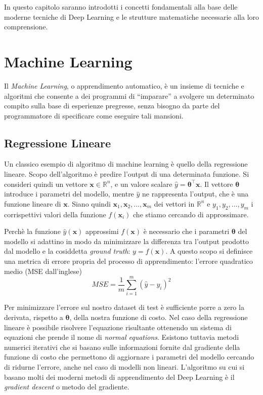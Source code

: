 
In questo capitolo saranno introdotti i concetti fondamentali alla base delle
moderne tecniche di Deep Learning e le strutture matematiche necessarie alla
loro comprensione.

\section{Machine Learning}
Il \emph{Machine Learning}, o apprendimento automatico, è un insieme di
tecniche e algoritmi che consente a dei programmi di ``imparare'' a svolgere
un determinato compito sulla base di esperienze pregresse, senza bisogno da
parte del programmatore di specificare come eseguire tali mansioni. 
\subsection{Regressione Lineare}
Un classico esempio di algoritmo di machine learning è quello della regressione
lineare. Scopo dell'algoritmo è predire l'output di una determinata funzione.
Si consideri quindi un vettore $ \bm x \in \mathbb{R}^n $, e un valore scalare
$\hat{y} = \bm \theta^\intercal \bm x$. Il vettore $\bm \theta$ introduce i
parametri del modello, mentre $\hat{y}$ ne rappresenta l'output, che è una
funzione lineare di $\bm x$. Siano quindi $ \bm x_1, \bm x_2, \dotsc, \bm x_m $
dei vettori in $\mathbb{R}^n$ e  $ y_1, y_2, \dotsc, y_m $ i corrispettivi
valori della funzione $f(\bm x_i)$ che stiamo cercando di approssimare.

Perchè la funzione $\hat{y}(\bm x)$ approssimi $f(\bm x)$ è necessario che i
parametri $\bm \theta$ del modello si adattino in modo da minimizzare la differenza
tra l'output prodotto dal modello e la cosiddetta \emph{ground truth}: $y =
f(\bm x)$. A questo scopo si definisce una metrica di errore propria del
processo di apprendimento: l'errore quadratico medio (MSE dall'inglese) 
\begin{equation} \label{eq:mse}
  MSE = \frac{1}{m} \sum_{i=1}^m{{(\hat{y} - y_i)}^2} 
\end{equation}

Per minimizzare l'errore sul nostro dataset di test è sufficiente porre a zero
la derivata, rispetto a $\bm \theta$, della nostra funzione di costo. Nel caso
della regressione lineare è possibile risolvere l'equazione risultante
ottenendo un sistema di equazioni che prende il nome di 
\emph{normal equations}.
Esistono tuttavia metodi numerici iterativi che si basano sulle informazioni
fornite dal gradiente della funzione di costo che permettono di aggiornare i
parametri del modello cercando di ridurne l'errore, anche nel caso di modelli
non lineari. L'algoritmo su cui si basano molti dei moderni metodi di
apprendimento del Deep Learning è il \emph{gradient descent} o metodo del
gradiente.


